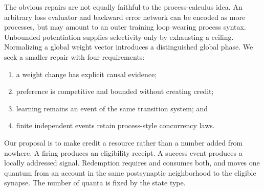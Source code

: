 \documentclass[11pt]{article}
\begin{document}
The obvious repairs are not equally faithful to the process-calculus idea.
An arbitrary loss evaluator and backward error network can be encoded as more
processes, but may amount to an outer training loop wearing process syntax.
Unbounded potentiation supplies selectivity only by exhausting a ceiling.
Normalizing a global weight vector introduces a distinguished global phase.
We seek a smaller repair with four requirements:

\begin{enumerate}
\item a weight change has explicit causal evidence;
\item preference is competitive and bounded without creating credit;
\item learning remains an event of the same transition system; and
\item finite independent events retain process-style concurrency laws.
\end{enumerate}

Our proposal is to make credit a resource rather than a number added from
nowhere.  A firing produces an eligibility receipt.  A success event produces
a locally addressed signal.  Redemption requires and consumes both, and moves
one quantum from an account in the same postsynaptic neighborhood to the
eligible synapse.  The number of quanta is fixed by the state type.

\begin{center}
\end{center}
\end{document}
